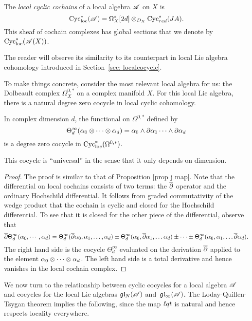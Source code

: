 \begin{dfn}\label{dfn: cycloc}
The {\em local cyclic cochains} of a local algebra $\mathscr A$ on $X$ is 
\[
{\rm Cyc}_{\rm loc}^*(\mathscr A) = \Omega^*_X[2d] \otimes_{D_X} {\rm Cyc}^*_{red} (JA) .
\] 
This sheaf of cochain complexes has global sections that we denote by~${\rm Cyc}_{\rm loc}^*(\mathscr A(X))$.
\end{dfn}

The reader will observe its similarity to its counterpart in local Lie algebra cohomology introduced in Section~\ref{sec: localcocycle}. 

To make things concrete, 
consider the most relevant local algebra for us: the Dolbeault complex $\Omega^{0,*}_X$ on a complex manifold $X$. 
For this local Lie algebra, there is a natural degree zero cocycle in local cyclic cohomology.

\begin{lem}
\label{lem: univ}
In complex dimension $d$, 
the functional on $\Omega^{0,*}$ defined by
\[
\Theta^\infty_d (\alpha_0 \otimes \cdots \otimes \alpha_d) = \alpha_0 \wedge \partial \alpha_1 \cdots \wedge \partial \alpha_d
\]
is a degree zero cocycle in ${\rm Cyc}_{\rm loc}^*(\Omega^{0,*})$. 
\end{lem}

This cocycle is ``universal'' in the sense that it only depends on dimension.

\begin{proof}
The proof is similar to that of Proposition \ref{prop j map}. 
Note that the differential on local cochains consists of two terms: the $\overline{\partial}$ operator and the ordinary Hochschild differential. 
It follows from graded commutativity of the wedge product that the cochain is cyclic and closed for the Hochschild differential. 
To see that it is closed for the other piece of the differential, observe that
\[
\overline{\partial} \Theta^\infty_d(\alpha_0,\cdots,\alpha_d) = \Theta^\infty_d(\overline{\partial} \alpha_0, \alpha_1,\ldots,\alpha_d) \pm \Theta_d^\infty(\alpha_0, \overline{\partial} \alpha_1,\ldots \alpha_d) \pm \cdots \pm \Theta_d^\infty(\alpha_0, \alpha_1,\ldots \overline{\partial} \alpha_d) .
\]
The right hand side is the cocycle $\Theta_d^\infty$ evaluated on the derivation $\overline{\partial}$ applied to the element $\alpha_0 \otimes \cdots \otimes \alpha_d$. 
The left hand side is a total derivative and hence vanishes in the local cochain complex. 
\end{proof}

We now turn to the relationship between cyclic cocycles for a local algebra $\mathscr A$ and cocycles for the local Lie algebras $\mathfrak{g} \mathfrak{l}_N( \mathscr A)$ and~$\mathfrak{g} \mathfrak{l}_\infty (\mathscr A)$.
The Loday-Quillen-Tsygan theorem implies the following,
since the map ${\ell q t}$ is natural and hence respects locality everywhere.

